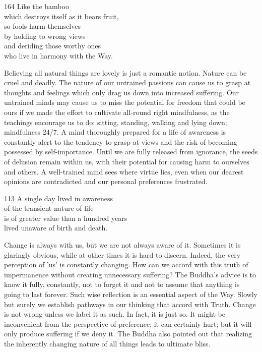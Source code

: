 \begin{dhpVerse}{164}
\label{dhp-164}
Like the bamboo\\
which destroys itself as it bears fruit,\\
so fools harm themselves\\
by holding to wrong views\\
and deriding those worthy ones\\
who live in harmony with the Way.
\end{dhpVerse}

\begin{dhpRefl}
  Believing all natural things are lovely is just a romantic notion. Nature can
  be cruel and deadly. The nature of our untrained passions can cause us to
  grasp at thoughts and feelings which only drag us down into increased
  suffering. Our untrained minds may cause us to miss the potential for freedom
  that could be ours if we made the effort to cultivate all-round right
  mindfulness, as the teachings encourage us to do: sitting, standing, walking
  and lying down; mindfulness 24/7. A mind thoroughly prepared for a life of
  awareness is constantly alert to the tendency to grasp at views and the risk
  of becoming possessed by self-importance. Until we are fully released from
  ignorance, the seeds of delusion remain within us, with their potential for
  causing harm to ourselves and others. A well-trained mind sees where virtue
  lies, even when our dearest opinions are contradicted and our personal
  preferences frustrated.
\end{dhpRefl}


\begin{dhpVerse}{113}
\label{dhp-113}
A single day lived in awareness\\
of the transient nature of life\\
is of greater value than a hundred years\\
lived unaware of birth and death.
\end{dhpVerse}

\begin{dhpRefl}
  Change is always with us, but we are not always aware of it. Sometimes it is
  glaringly obvious, while at other times it is hard to discern. Indeed, the
  very perception of 'us' is constantly changing. How can we accord with this
  truth of impermanence without creating unnecessary suffering? The Buddha's
  advice is to know it fully, constantly, not to forget it and not to assume
  that anything is going to last forever. Such wise reflection is an essential
  aspect of the Way. Slowly but surely we establish pathways in our thinking
  that accord with Truth. Change is not wrong unless we label it as such. In
  fact, it is just so. It might be inconvenient from the perspective of
  preference; it can certainly hurt; but it will only produce suffering if we
  deny it. The Buddha also pointed out that realizing the inherently changing
  nature of all things leads to ultimate bliss.
\end{dhpRefl}

